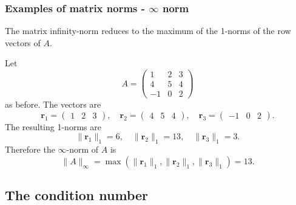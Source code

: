 \documentclass{beamer}
\newcommand{\bfm}[1]{{\boldsymbol{#1}}}
\begin{document}
 \begin{frame}
   \frametitle{Examples of matrix norms - $\infty$ norm}

   The matrix infinity-norm reduces to the maximum of the 1-norms of
   the row vectors of $A$. \pause

   Let
   \begin{equation*}
     A =
     \begin{pmatrix}
       1 & 2 & 3 \\
       4 & 5 & 4 \\
       -1 & 0 & 2
     \end{pmatrix}
   \end{equation*}
   as before. \pause The  vectors are
   \begin{equation*}
     \bfm{r}_1 =
     \begin{pmatrix}
       1 & 2 & 3
     \end{pmatrix}, \quad
     \bfm{r}_2 =
     \begin{pmatrix}
       4 & 5 & 4
     \end{pmatrix}, \quad
     \bfm{r}_3 =
     \begin{pmatrix}
       -1 & 0 & 2
     \end{pmatrix}.
   \end{equation*} \pause
   The resulting 1-norms are
   \begin{equation*}
     \| \bfm{r}_1 \|_1 = 6, \quad
     \| \bfm{r}_2 \|_1 = 13, \quad
     \| \bfm{r}_3 \|_1 = 3.
   \end{equation*} \pause
   Therefore the $\infty$-norm of $A$ is
   \begin{equation*}
     \| A \|_{\infty} = \max ( \| \bfm{r}_1 \|_1, \| \bfm{r}_2 \|_1, \| \bfm{r}_3
     \|_1 ) = 13.
   \end{equation*}

 \end{frame}


 \subsection{The condition number}
\end{document}
